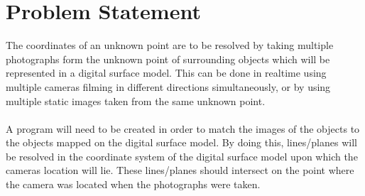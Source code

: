 

\section{Problem Statement}
The coordinates of an unknown point are to be resolved by taking multiple photographs form the 
unknown point of surrounding objects which will be represented in a digital surface model. 
This can be done in realtime using multiple cameras filming in different directions simultaneously, 
or by using multiple static images taken from the same unknown point.

\paragraph{}
 A program will need to be created in order to match the images of the objects to the objects 
 mapped on the digital surface model. 
 By doing this, lines/planes will be resolved in the coordinate system of the digital surface 
 model upon which the cameras location will lie.
 These lines/planes should intersect on the point where the camera was located when the photographs were taken.

